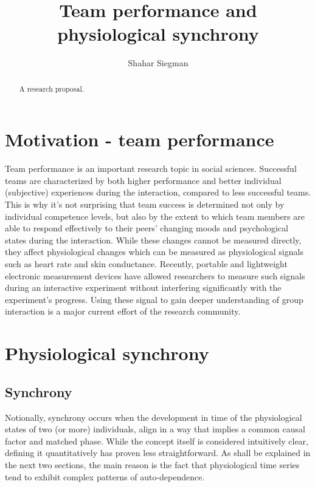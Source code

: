 \documentclass[a4paper, 11pt]{article}      %
\title{\LARGE \bf
Team performance and physiological synchrony
}
\author{Shahar Siegman}
\begin{document}
\maketitle
\thispagestyle{empty}
\pagestyle{empty}


\begin{abstract}

A research proposal.

\end{abstract}

\section{Motivation - team performance}
Team performance is an important research topic in social sciences. Successful teams are characterized by both higher performance and better individual (subjective) experiences during the interaction, compared to less successful teams. This is why it's not surprising that team success is determined not only by individual competence levels, but also by the extent to which team members are able to respond effectively to their peers' changing moods and psychological states during the interaction. While these changes cannot be measured directly, they affect physiological changes which can be measured as physiological signals such as heart rate and skin conductance. Recently, portable and lightweight electronic measurement devices have allowed researchers to measure such signals during an interactive experiment without interfering significantly with the experiment's progress. Using these signal to gain deeper understanding of group interaction is a major current effort of the research community. 


\section{Physiological synchrony}
\subsection{Synchrony}
Notionally, synchrony occurs when the development in time of the physiological states of two (or more) individuals, align in a way that implies a common causal factor and matched phase. 
While the concept itself is considered intuitively clear, defining it quantitatively has proven less straightforward. As shall be explained in the next two sections, the main reason is the fact that physiological time series tend to exhibit complex patterns of auto-dependence. 
\end{document}
